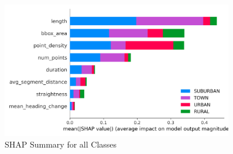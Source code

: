\documentclass[a4paper,12pt,twoside]{scrreprt}
\begin{document}
\begin{figure}[htbp]
  \centering

  \includegraphics[width=0.9\textwidth]{Figures/classifier/shap_summary_for_all_classes.png}
  \caption{SHAP Summary for all Classes}
  \label{fig:shap_all_classes}
\end{figure}
\end{document}
